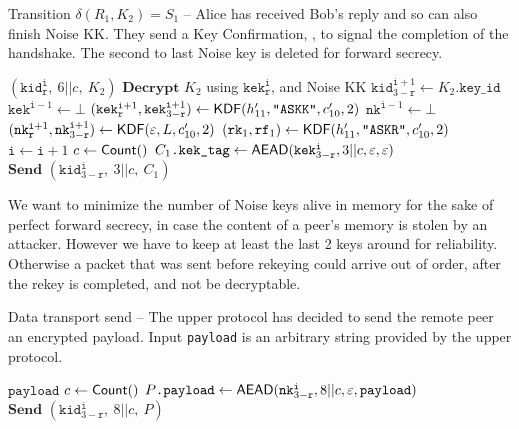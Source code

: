 \documentclass{article}
\begin{document}
\begin{algorithm}
	\caption{Transition $\delta(R_1, K_2)=S_1$ -- Alice has received Bob's reply and so can also finish Noise KK. They send a Key Confirmation, , to signal the completion of the handshake. The second to last Noise key is deleted for forward secrecy.}
	\begin{algorithmic}
		\Require $(\texttt{kid}^\texttt{i}_\texttt{r},\ 6||c,\ K_2)$
		\State $\textbf{Decrypt } K_2$ using $\texttt{kek}^\texttt{i}_\texttt{r}$, and Noise KK
		\State $\texttt{kid}^{\texttt{i} + 1}_{3 - \texttt{r}} \gets K_2\texttt{.key\_id}$
		\State $\texttt{kek}^{\texttt{i} - 1} \gets \bot$
		\State $(\texttt{kek}^{\texttt{i} + 1}_\texttt{r}, \texttt{kek}^{\texttt{i} + 1}_{3 - \texttt{r}}) \gets \text{\sf KDF}(h_{11}', \texttt{"ASKK"}, c_{10}', 2)$
		\State $\texttt{nk}^{\texttt{i} - 1} \gets \bot$
		\State $(\texttt{nk}^{\texttt{i} + 1}_\texttt{r}, \texttt{nk}^{\texttt{i} + 1}_{3 - \texttt{r}}) \gets \text{\sf KDF}(\varepsilon, L, c_{10}', 2)$
		\State $(\texttt{rk}_1, \texttt{rf}_1) \gets \text{\sf KDF}(h_{11}', \texttt{"ASKR"}, c_{10}', 2)$
		\State $\texttt{i} \gets \texttt{i} + 1$
		\State $c \gets \text{\sf Count}()$
		\State $C_1\texttt{.kek\_tag} \gets \text{\sf AEAD}(\texttt{kek}^\texttt{i}_{3 - \texttt{r}}, 3||c, \varepsilon, \varepsilon)$
		\State $\textbf{Send } (\texttt{kid}^\texttt{i}_{3 - \texttt{r}},\ 3||c,\ C_1)$
	\end{algorithmic}
\end{algorithm}

We want to minimize the number of Noise keys alive in memory for the sake of perfect forward secrecy, in case the content of a peer's memory is stolen by an attacker. However we have to keep at least the last 2 keys around for reliability. Otherwise a packet that was sent before rekeying could arrive out of order, after the rekey is completed, and not be decryptable.

\begin{algorithm}
	\caption{Data transport send -- The upper protocol has decided to send the remote peer an encrypted payload. Input \texttt{payload} is an arbitrary string provided by the upper protocol.}
	\begin{algorithmic}
		\Require $\texttt{payload}$
		\State $c \gets \text{\sf Count}()$
		\State $P\texttt{.payload} \gets \text{\sf AEAD}(\texttt{nk}^\texttt{i}_{3 - \texttt{r}}, 8||c, \varepsilon, \texttt{payload})$
		\State $\textbf{Send } (\texttt{kid}^\texttt{i}_{3 - \texttt{r}},\ 8||c,\ P)$
	\end{algorithmic}
\end{algorithm}
\end{document}
